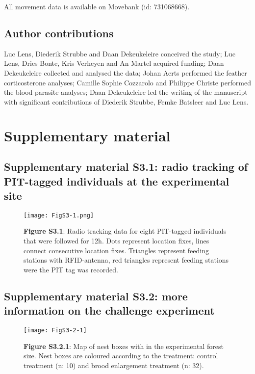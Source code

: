 \documentclass[10pt, twoside]{book} %
\begin{document}
All movement data is available on Movebank (id: 731068668).
	
	\subsection*{Author contributions}
	 Luc Lens, Diederik Strubbe and Daan Dekeukeleire conceived the study; Luc Lens, Dries Bonte, Kris Verheyen and An Martel acquired funding; Daan Dekeukeleire collected and analysed the data; Johan Aerts performed the feather corticosterone analyses; Camille Sophie Cozzarolo and Philippe Christe performed the blood parasite analyses; Daan Dekeukeleire led the writing of the manuscript with significant contributions of Diederik Strubbe, Femke Batsleer and Luc Lens.\\
	 \clearpage
	
	\section{Supplementary material}
	
	\subsection*{Supplementary material S3.1: radio tracking of PIT-tagged individuals at the experimental site}
	
\begin{figure}[h!]
	\begin{center}
		\texttt{[image: FigS3-1.png]}
	\end{center}
\caption*{\textbf{Figure S3.1}: Radio tracking data for eight PIT-tagged individuals that were followed for 12h. Dots represent location fixes, lines connect consecutive location fixes. Triangles represent feeding stations with RFID-antenna, red triangles represent feeding stations were the PIT tag was recorded.}
\end{figure}
\clearpage

	\subsection*{Supplementary material S3.2: more information on the challenge experiment}

\begin{figure}[h]
	\begin{center}
		\texttt{[image: FigS3-2-1]}
	\end{center}
	\caption*{\textbf{Figure S3.2.1}: Map of nest boxes with in the experimental forest size. Nest boxes are coloured according to the treatment: control treatment (n: 10) and brood enlargement treatment (n: 32).}
\end{figure}
\end{document}
